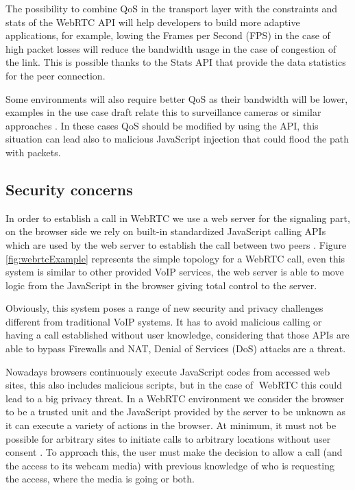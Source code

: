 The possibility to combine QoS in the transport layer with the constraints and stats of the WebRTC API will help developers to build more adaptive applications, for example, lowing the Frames per Second (FPS) in the case of high packet losses will reduce the bandwidth usage in the case of congestion of the link. This is possible thanks to the Stats API that provide the data statistics for the peer connection.

Some environments will also require better QoS as their bandwidth will be lower, examples in the use case draft relate this to surveillance cameras or similar approaches \cite{WebRTCcasesIETF}. In these cases QoS should be modified by using the API, this situation can lead also to malicious JavaScript injection that could flood the path with packets. 

\subsection{Security concerns}

In order to establish a call in WebRTC we use a web server for the signaling part, on the browser side we rely on built-in standardized JavaScript calling APIs which are used by the web server to establish the call between two peers \cite{WebRTCcasesIETF}. Figure \ref{fig:webrtcExample} represents the simple topology for a WebRTC call, even this system is similar to other provided VoIP services, the web server is able to move logic from the JavaScript in the browser giving total control to the server.

Obviously, this system poses a range of new security and privacy challenges different from traditional VoIP systems. It has to avoid malicious calling or having a call established without user knowledge, considering that those APIs are able to bypass Firewalls and NAT, Denial of Services (DoS) attacks are a threat.

Nowadays browsers continuously execute JavaScript codes from accessed web sites, this also includes malicious scripts, but in the case of WebRTC this could lead to a big privacy threat. In a WebRTC environment we consider the browser to be a trusted unit and the JavaScript provided by the server to be unknown as it can execute a variety of actions in the browser. At minimum, it must not be possible for arbitrary sites to initiate calls to arbitrary locations without user consent \cite{rtcwebSecurityIETF}. To approach this, the user must make the decision to allow a call (and the access to its webcam media) with previous knowledge of who is requesting the access, where the media is going or both.

